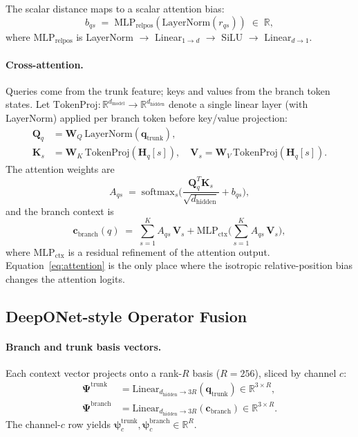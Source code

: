 The scalar distance maps to a scalar attention bias:
\begin{equation*}
    b_{qs} \;=\; \mathrm{MLP}_{\text{relpos}}(\mathrm{LayerNorm}(r_{qs})) \;\in\;\mathbb{R},
\end{equation*}
where $\mathrm{MLP}_{\text{relpos}}$ is LayerNorm $\to$ Linear$_{1\to d}$ $\to$ SiLU $\to$ Linear$_{d\to 1}$.

\paragraph{Cross-attention.}
Queries come from the trunk feature; keys and values from the branch token states. Let $\mathrm{TokenProj}:\mathbb{R}^{d_{\text{model}}}\!\to\!\mathbb{R}^{d_{\text{hidden}}}$ denote a single linear layer (with LayerNorm) applied per branch token before key/value projection:
\begin{align}
    \mathbf{Q}_q &= \mathbf{W}_Q\,\mathrm{LayerNorm}(\mathbf{q}_{\text{trunk}}),\\
    \mathbf{K}_s &= \mathbf{W}_K\,\mathrm{TokenProj}(\mathbf{H}_q[s]),\quad
    \mathbf{V}_s = \mathbf{W}_V\,\mathrm{TokenProj}(\mathbf{H}_q[s]).
\end{align}
The attention weights are
\begin{equation}
    \label{eq:attention}
    A_{qs} \;=\; \mathrm{softmax}_s\!\Big(\frac{\mathbf{Q}_q^T\mathbf{K}_s}{\sqrt{d_{\text{hidden}}}} + b_{qs}\Big),
\end{equation}
and the branch context is
\begin{equation*}
    \mathbf{c}_{\text{branch}}(q) \;=\; \sum_{s=1}^K A_{qs}\,\mathbf{V}_s + \mathrm{MLP}_{\text{ctx}}\!\Big(\sum_{s=1}^K A_{qs}\,\mathbf{V}_s\Big),
\end{equation*}
where $\mathrm{MLP}_{\text{ctx}}$ is a residual refinement of the attention output. Equation~\eqref{eq:attention} is the only place where the isotropic relative-position bias changes the attention logits.

\subsection{DeepONet-style Operator Fusion}
\label{subsec:operator_fusion}

\paragraph{Branch and trunk basis vectors.}
Each context vector projects onto a rank-$R$ basis ($R = 256$), sliced by channel $c$:
\begin{align}
    \boldsymbol{\Psi}^{\text{trunk}} &= \mathrm{Linear}_{d_{\text{hidden}}\to 3R}(\mathbf{q}_{\text{trunk}}) \in\mathbb{R}^{3\times R},\\
    \boldsymbol{\Psi}^{\text{branch}} &= \mathrm{Linear}_{d_{\text{hidden}}\to 3R}(\mathbf{c}_{\text{branch}}) \in\mathbb{R}^{3\times R}.
\end{align}
The channel-$c$ row yields $\boldsymbol{\psi}^{\text{trunk}}_c, \boldsymbol{\psi}^{\text{branch}}_c \in \mathbb{R}^R$.

